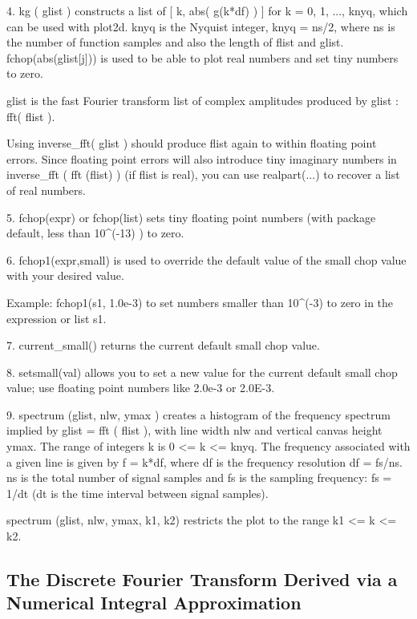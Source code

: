 \documentclass[11pt]{article}
\begin{document}
\newpage
\begin{myVerbatim2s}
4.  kg ( glist ) constructs a list of [ k, abs( g(k*df) ) ] 
     for k = 0, 1, ..., knyq, which can be used with plot2d.
	 knyq is the Nyquist integer, knyq = ns/2, 
     where ns is the number of function samples and also the 
     length of flist and glist. fchop(abs(glist[j])) is 
     used to be able to plot real numbers and set tiny
	 numbers to zero.
	 
     glist is the fast Fourier transform list of complex amplitudes
	 produced by glist : fft( flist ). 
	 
	 Using inverse_fft( glist ) should produce flist again to within
	 floating point errors. Since floating point errors will also
	 introduce tiny imaginary numbers in inverse_fft ( fft (flist) )
	 (if flist is real), you can use realpart(...) to recover
	 a list of real numbers.

5.  fchop(expr) or fchop(list) sets tiny floating point
          numbers (with package default, less than 10^(-13) ) to zero.
		  
6.  fchop1(expr,small) is used to override the default value of
       the small chop value with your desired value.	  
	
      Example: fchop1(s1, 1.0e-3) to set numbers smaller than
       10^(-3) to zero in the expression or list s1.
	
7.  current_small() returns the current default small chop value.	 

8.  setsmall(val) allows you to set a new value for the
     current default small chop value; use floating point
     numbers like 2.0e-3 or 2.0E-3.
	 
9.  spectrum (glist, nlw, ymax ) creates a histogram of the frequency
    spectrum implied by glist = fft ( flist ), with line width nlw
	and vertical canvas height ymax. The range of integers
	k is 0 <= k <= knyq. The frequency associated with a given
	line is given by f = k*df, where df is the frequency 
	resolution df = fs/ns. ns is the total number of signal samples
	and fs is the sampling frequency: fs = 1/dt (dt is the time 
	interval between signal samples).
	
	spectrum (glist, nlw, ymax, k1, k2) restricts the plot to
	the range k1 <= k <= k2.
\end{myVerbatim2s}
\newpage
\subsection{The Discrete Fourier Transform Derived via a Numerical Integral Approximation}
\end{document}
